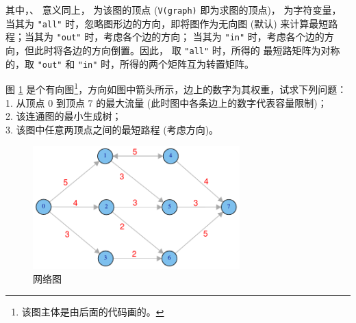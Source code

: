 其中，、 意义同上，
 为该图的顶点 (\verb|V(graph)| 即为求图的顶点)，
 为字符变量，
当其为 \verb|"all"| 时，忽略图形边的方向，即将图作为无向图 (默认) 来计算最短路程；当其为 \verb|"out"| 时，考虑各个边的方向；
当其为 \verb|"in"| 时，考虑各个边的方向，但此时将各边的方向倒置。因此， 取 \verb|"all"| 时，所得的
最短路矩阵为对称的，取 \verb|"out"| 和 \verb|"in"| 时，所得的两个矩阵互为转置矩阵。
\begin{exmp}\label{ex:graph}
图 \ref{fig:graph} 是个有向图\footnote{该图主体是由后面的代码画的。}，方向如图中箭头所示，边上的数字为其权重，试求下列问题：\\
 1. 从顶点 0 到顶点 7 的最大流量 (此时图中各条边上的数字代表容量限制)；\\
 2. 该连通图的最小生成树；\\
 3. 该图中任意两顶点之间的最短路程 (考虑方向)。
\end{exmp}
\begin{figure}[h]
\centering
\includegraphics[width=8cm]{./pic/graph}
\caption{网络图}\label{fig:graph}
\end{figure}

